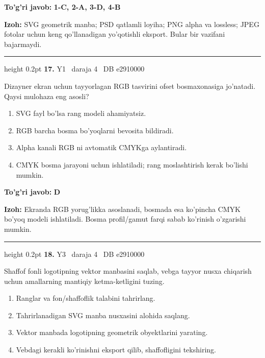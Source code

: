 \documentclass[10pt,a4paper,oneside]{article}
\begin{document}
\begin{tcolorbox}[enhanced,breakable,colback=teal!4,colframe=teal!45!black,boxrule=0.45pt,arc=1.2mm,left=2.8mm,right=2.8mm,top=2mm,bottom=2mm,before skip=2mm,after skip=2mm]
\textbf{\color{teal}To'g'ri javob:} \textbf{1-C, 2-A, 3-D, 4-B}
\par\smallskip
\textbf{Izoh:} SVG geometrik manba; PSD qatlamli loyiha; PNG alpha va lossless; JPEG fotolar uchun keng qo'llanadigan yo'qotishli eksport. Bular bir vazifani bajarmaydi.
\end{tcolorbox}
\vspace{2mm}\hrule height 0.2pt \vspace{4mm}
\hypertarget{q17}{\textbf{\color{ink}17.}}  {\color{muted}\scriptsize Y1 \textbullet\ daraja 4 \textbullet\ DB e2910000}
\par
Dizayner ekran uchun tayyorlagan RGB tasvirini ofset bosmaxonasiga jo'natadi. Qaysi mulohaza eng asosli?
\begin{enumerate}[label=\Alph*),leftmargin=9mm]
\item SVG fayl bo'lsa rang modeli ahamiyatsiz.
\item RGB barcha bosma bo'yoqlarni bevosita bildiradi.
\item Alpha kanali RGB ni avtomatik CMYKga aylantiradi.
\item CMYK bosma jarayoni uchun ishlatiladi; rang moslashtirish kerak bo'lishi mumkin.
\end{enumerate}
\begin{tcolorbox}[enhanced,breakable,colback=teal!4,colframe=teal!45!black,boxrule=0.45pt,arc=1.2mm,left=2.8mm,right=2.8mm,top=2mm,bottom=2mm,before skip=2mm,after skip=2mm]
\textbf{\color{teal}To'g'ri javob:} \textbf{D}
\par\smallskip
\textbf{Izoh:} Ekranda RGB yorug'likka asoslanadi, bosmada esa ko'pincha CMYK bo'yoq modeli ishlatiladi. Bosma profil/gamut farqi sabab ko'rinish o'zgarishi mumkin.
\end{tcolorbox}
\vspace{2mm}\hrule height 0.2pt \vspace{4mm}
\hypertarget{q18}{\textbf{\color{ink}18.}}  {\color{muted}\scriptsize Y3 \textbullet\ daraja 4 \textbullet\ DB e2910000}
\par
Shaffof fonli logotipning vektor manbasini saqlab, vebga tayyor nusxa chiqarish uchun amallarning mantiqiy ketma-ketligini tuzing.
\begin{enumerate}[label=\Alph*),leftmargin=9mm]
\item Ranglar va fon/shaffoflik talabini tahrirlang.
\item Tahrirlanadigan SVG manba nusxasini alohida saqlang.
\item Vektor manbada logotipning geometrik obyektlarini yarating.
\item Vebdagi kerakli ko'rinishni eksport qilib, shaffofligini tekshiring.
\end{enumerate}
\end{document}
